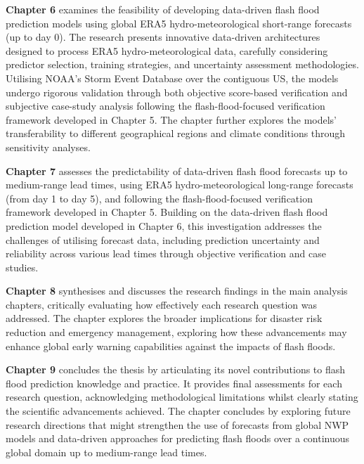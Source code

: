 \textbf{Chapter 6} examines the feasibility of developing data-driven flash flood prediction models using global ERA5 hydro-meteorological short-range forecasts (up to day 0). The research presents innovative data-driven architectures designed to process ERA5 hydro-meteorological data, carefully considering predictor selection, training strategies, and uncertainty assessment methodologies. Utilising NOAA's Storm Event Database over the contiguous US, the models undergo rigorous validation through both objective score-based verification and subjective case-study analysis following the flash-flood-focused verification framework developed in Chapter 5. The chapter further explores the models' transferability to different geographical regions and climate conditions through sensitivity analyses.

\textbf{Chapter 7} assesses the predictability of data-driven flash flood forecasts up to medium-range lead times, using ERA5 hydro-meteorological long-range forecasts (from day 1 to day 5), and following the flash-flood-focused verification framework developed in Chapter 5. Building on the data-driven flash flood prediction model developed in Chapter 6, this investigation addresses the challenges of utilising forecast data, including prediction uncertainty and reliability across various lead times through objective verification and case studies. 

\textbf{Chapter 8} synthesises and discusses the research findings in the main analysis chapters, critically evaluating how effectively each research question was addressed. The chapter explores the broader implications for disaster risk reduction and emergency management, exploring how these advancements may enhance global early warning capabilities against the impacts of flash floods. 

\textbf{Chapter 9} concludes the thesis by articulating its novel contributions to flash flood prediction knowledge and practice. It provides final assessments for each research question, acknowledging methodological limitations whilst clearly stating the scientific advancements achieved. The chapter concludes by exploring future research directions that might strengthen the use of forecasts from global NWP models and data-driven approaches for predicting flash floods over a continuous global domain up to medium-range lead times. 